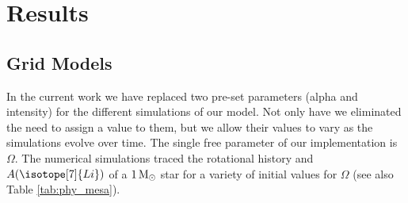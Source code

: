 \documentclass[fleqn,usenatbib]{mnras}
\begin{document}
\section{Results} \label{sec_3}

\subsection{Grid Models} \label{sec_grid}
In the current work we have replaced two pre-set parameters (alpha and intensity) for the different simulations of our model. Not only have we eliminated the need to assign a value to them, but we allow their values to vary as the simulations evolve over time. The single free parameter of our implementation is $\Omega$. The numerical simulations traced the rotational history and $A(\isotope[7]{Li})$ of a $1\, \mathrm{M}_\odot$ star for a variety of initial values for $\Omega$ (see also Table \ref{tab:phy_mesa}).\par
\end{document}
